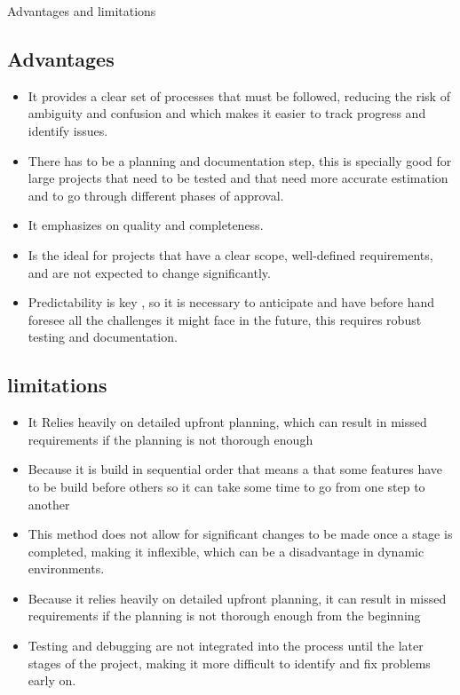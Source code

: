 \begin{section}{Advantages and limitations}
    \subsection{Advantages}
    
    \begin{itemize}
        \item It provides a clear set of processes that must be followed, reducing the risk of ambiguity and confusion and which makes it easier to track progress and identify issues. 
        
        \item  There has to be a planning and documentation step, this is specially good for large projects that need to be tested and that need more accurate estimation and to go through different phases of approval.
        
        \item It emphasizes on quality and completeness.
        
        \item  Is the ideal for projects that have a clear scope, well-defined requirements, and are not expected to change significantly.
        
        \item Predictability  is key , so it is necessary to anticipate and have before hand foresee all the challenges it might face in the future, this requires robust testing and documentation.
    
    
    \end{itemize}
    \subsection{limitations}
    
    \begin{itemize}
        \item It Relies heavily on detailed upfront planning, which can result in missed requirements if the planning is not thorough enough
        \item Because it is build in sequential order that means a that some features have to be build before others so it can take some time to go from one step to another
        \item This method does not allow for significant changes to be made once a stage is completed, making it inflexible, which can be a disadvantage in dynamic environments.
        \item Because it relies heavily on detailed upfront planning, it can result in missed requirements if the planning is not thorough enough from the beginning 
        \item Testing and debugging are not integrated into the process until the later stages of the project, making it more difficult to identify and fix problems early on.
        

\end{itemize}
\end{section}
